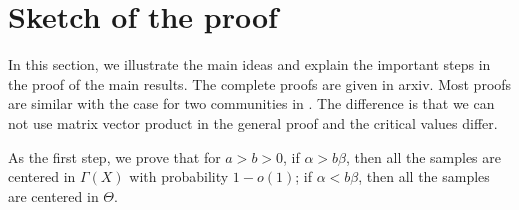 \documentclass[conference]{IEEEtran}
\begin{document}
\section{Sketch of the proof}
\label{sect:sketch}

In this section, we illustrate the main ideas and explain the important steps in the proof of the main results.
The complete proofs are given in arxiv. Most proofs are similar with the case for two communities in \cite{ye2020exact}. The difference
is that we can not use matrix vector product in the general proof and the critical values differ.

As the first step, we prove that for $a>b>0$, if $\alpha>b\beta$, then all the samples are centered in $\Gamma(X)$ with probability $1-o(1)$;
if $\alpha<b\beta$, then all the samples are centered in $\Theta$.
\end{document}
